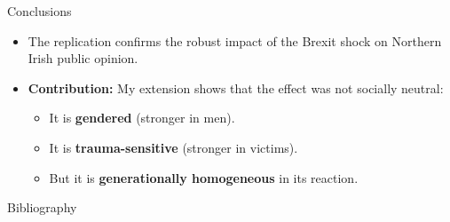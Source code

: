 \documentclass[10pt]{beamer}
\begin{document}
	\begin{frame}{Conclusions}
		\begin{itemize}
			\item The replication confirms the robust impact of the Brexit shock on Northern Irish public opinion.
			\item \textbf{Contribution:} My extension shows that the effect was not socially neutral:
			\begin{itemize}
				\item It is \textbf{gendered} (stronger in men).
				\item It is \textbf{trauma-sensitive} (stronger in victims).
				\item But it is \textbf{generationally homogeneous} in its reaction.
			\end{itemize}
		\end{itemize}
	\end{frame}
	
	\begin{frame}[allowframebreaks]{Bibliography}
\printbibliography
	\end{frame}
	
\end{document}

